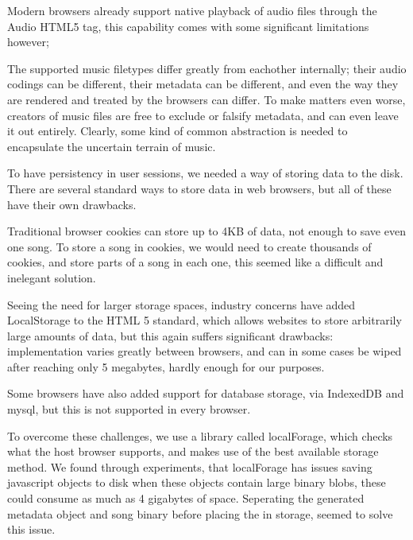 
Modern browsers already support native playback of audio files through the Audio HTML5 tag, 
this capability comes with some significant limitations however; 


The supported music filetypes differ greatly from eachother internally; 
their audio codings can be different, their metadata can be different,
and even the way they are rendered and treated by the browsers can differ.
To make matters even worse, 
creators of music files are free to exclude or falsify metadata, and can even leave it out entirely.
Clearly, some kind of common abstraction is needed to encapsulate the uncertain terrain of music.


To have persistency in user sessions, we needed a way of storing data to the disk. There are several standard ways to store data in web browsers, but all of these have their own drawbacks.

Traditional browser cookies can store up to 4KB of data, 
not enough to save even one song. 
To store a song in cookies, 
we would need to create thousands of cookies, 
and store parts of a song in each one, 
this seemed like a difficult and inelegant solution.

Seeing the need for larger storage spaces, 
industry concerns have added LocalStorage to the HTML 5 standard,
which allows websites to store arbitrarily large amounts of data,
but this again suffers significant drawbacks: 
implementation varies greatly between browsers, 
and can in some cases be wiped after reaching only 5 megabytes, 
hardly enough for our purposes.

Some browsers have also added support for database storage, via IndexedDB and mysql, but this is not supported in every browser.

To overcome these challenges, we use a library called localForage, 
which checks what the host browser supports,
and makes use of the best available storage method.
We found through experiments,
that localForage has issues saving javascript objects to disk when these objects contain large binary blobs, 
these could consume as much as 4 gigabytes of space.
Seperating the generated metadata object and song binary before placing the in storage, 
seemed to solve this issue.

